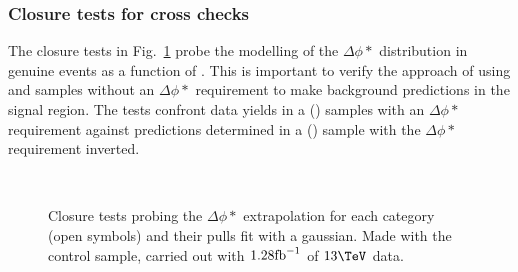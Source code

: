 \subsubsection{Closure tests for cross checks}
\label{sec:closureCrossCheck}

The closure tests in Fig.~\ref{fig:closureBDPhi} probe the
modelling of the $\Delta\phi *$ distribution in genuine \met events as a
function of \scalht. This is important to verify the approach of using
\mj and \mmj samples without an $\Delta\phi *$ requirement to
make background predictions in the signal region. The tests confront
data yields in a \mj (\mmj) samples with an $\Delta\phi *$ requirement against
predictions determined in a \mj (\mmj) sample with the $\Delta\phi *$ requirement
inverted. 

\begin{figure}[h!]
  \begin{center}
    ~~
    \caption{Closure tests probing the $\Delta\phi *$ extrapolation for each
    \njet category (open symbols) and their pulls fit with a gaussian.
    Made with the \mj control sample, carried out with $1.28\text{fb}^{-1}$ of
      $13\tev$ data. }
    \label{fig:closureBDPhi}
  \end{center} 
\end{figure}


